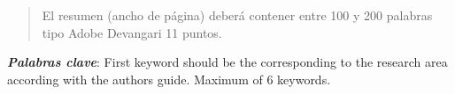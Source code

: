     
    
    \begin{abstract}
    \noindent 
    El resumen (ancho de página) deberá contener entre 100 y 200 palabras tipo Adobe Devangari 11 puntos.
    
    \end{abstract}
    \textbf{\textit{Palabras clave}}: {First keyword should be the corresponding to the research area according with the authors guide. Maximum of 6 keywords.}
    
